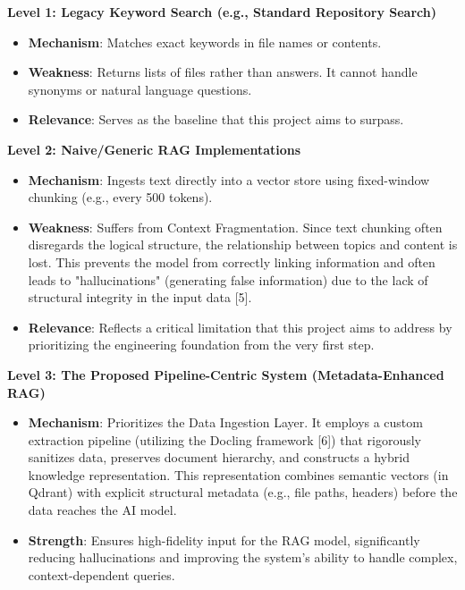 \documentclass[12pt]{article}
\begin{document}
\textbf{Level 1: Legacy Keyword Search (e.g., Standard Repository Search)}
\begin{itemize}
    \item \textbf{Mechanism}: Matches exact keywords in file names or contents.
    \item \textbf{Weakness}: Returns lists of files rather than answers. It cannot handle synonyms or natural language questions.
    \item \textbf{Relevance}: Serves as the baseline that this project aims to surpass.
\end{itemize}

\textbf{Level 2: Naive/Generic RAG Implementations}
\begin{itemize}
    \item \textbf{Mechanism}: Ingests text directly into a vector store using fixed-window chunking (e.g., every 500 tokens).
    \item \textbf{Weakness}: Suffers from Context Fragmentation. Since text chunking often disregards the logical structure, the relationship between topics and content is lost. This prevents the model from correctly linking information and often leads to "hallucinations" (generating false information) due to the lack of structural integrity in the input data [5].
    \item \textbf{Relevance}: Reflects a critical limitation that this project aims to address by prioritizing the engineering foundation from the very first step.
\end{itemize}

\textbf{Level 3: The Proposed Pipeline-Centric System (Metadata-Enhanced RAG)}
\begin{itemize}
    \item \textbf{Mechanism}: Prioritizes the Data Ingestion Layer. It employs a custom extraction pipeline (utilizing the Docling framework [6]) that rigorously sanitizes data, preserves document hierarchy, and constructs a hybrid knowledge representation. This representation combines semantic vectors (in Qdrant) with explicit structural metadata (e.g., file paths, headers) before the data reaches the AI model.
    \item \textbf{Strength}: Ensures high-fidelity input for the RAG model, significantly reducing hallucinations and improving the system's ability to handle complex, context-dependent queries.
\end{itemize}
\end{document}
